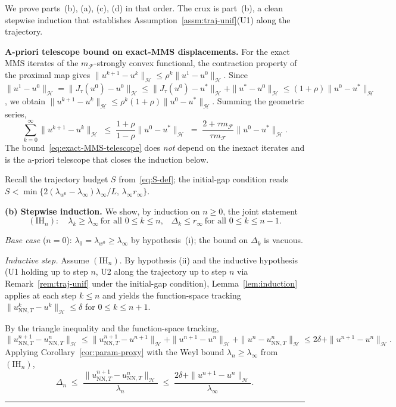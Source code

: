 \documentclass[twoside,11pt]{article}
\newcommand{\BlackBoxProof}{\rule{1.5ex}{1.5ex}}
\renewenvironment{proof}{\par\noindent{\bf Proof\ }}{\hfill\BlackBoxProof\par\medskip}
\newcommand{\NN}{\mathrm{NN}}
\newcommand{\calF}{\mathcal{F}}
\newcommand{\calH}{\mathcal{H}}
\begin{document}
\begin{proof}
We prove parts~(b), (a), (c), (d) in that order. The crux is part~(b), a clean stepwise induction that establishes Assumption~\ref{assm:traj-unif}(U1) along the trajectory.

\smallskip
\noindent\textbf{A-priori telescope bound on exact-MMS displacements.}
For the exact MMS iterates of the $m_\calF$-strongly convex functional, the contraction property of the proximal map gives $\|u^{k+1}-u^k\|_\calH\le\rho^k\|u^1-u^0\|_\calH$. Since
$\|u^1-u^0\|_\calH=\|J_\tau(u^0)-u^0\|_\calH\le\|J_\tau(u^0)-u^*\|_\calH+\|u^*-u^0\|_\calH\le(1+\rho)\|u^0-u^*\|_\calH$,
we obtain $\|u^{k+1}-u^k\|_\calH\le\rho^k(1+\rho)\|u^0-u^*\|_\calH$. Summing the geometric series,
\begin{equation}\label{eq:exact-MMS-telescope}
\sum_{k=0}^{\infty}\|u^{k+1}-u^k\|_\calH
\;\le\; \frac{1+\rho}{1-\rho}\|u^0-u^*\|_\calH
\;=\; \frac{2+\tau m_\calF}{\tau m_\calF}\|u^0-u^*\|_\calH .
\end{equation}
The bound~\eqref{eq:exact-MMS-telescope} does \emph{not} depend on the inexact iterates and is the a-priori telescope that closes the induction below.

Recall the trajectory budget $S$ from~\eqref{eq:S-def}; the initial-gap condition reads $S<\min\{2(\lambda_{w^0}-\lambda_\infty)\lambda_\infty/L,\,\lambda_\infty r_\infty\}$.

\smallskip
\noindent\textbf{(b) Stepwise induction.} We show, by induction on $n\ge 0$, the joint statement
\[
(\mathrm{IH}_n):\quad \lambda_k\ge\lambda_\infty \ \text{for all $0\le k\le n$,} \quad \Delta_k\le r_\infty \ \text{for all $0\le k\le n-1$.}
\]

\emph{Base case} ($n=0$): $\lambda_0=\lambda_{w^0}\ge\lambda_\infty$ by hypothesis~(i); the bound on $\Delta_k$ is vacuous.

\emph{Inductive step.} Assume $(\mathrm{IH}_n)$. By hypothesis (ii) and the inductive hypothesis (U1 holding up to step $n$, U2 along the trajectory up to step $n$ via Remark~\ref{rem:traj-unif} under the initial-gap condition), Lemma~\ref{lem:induction} applies at each step $k\le n$ and yields the function-space tracking $\|u^k_{\NN,T}-u^k\|_\calH\le\delta$ for $0\le k\le n+1$.

By the triangle inequality and the function-space tracking,
\[
\|u^{n+1}_{\NN,T}-u^n_{\NN,T}\|_\calH \le \|u^{n+1}_{\NN,T}-u^{n+1}\|_\calH+\|u^{n+1}-u^n\|_\calH+\|u^n-u^n_{\NN,T}\|_\calH \le 2\delta+\|u^{n+1}-u^n\|_\calH.
\]
Applying Corollary~\ref{cor:param-proxy} with the Weyl bound $\lambda_n\ge\lambda_\infty$ from $(\mathrm{IH}_n)$,
\begin{equation}\label{eq:per-step-lambda-inf}
\Delta_n \;\le\; \frac{\|u^{n+1}_{\NN,T}-u^n_{\NN,T}\|_\calH}{\lambda_n} \;\le\; \frac{2\delta+\|u^{n+1}-u^n\|_\calH}{\lambda_\infty}.
\end{equation}


\end{proof}
\end{document}
